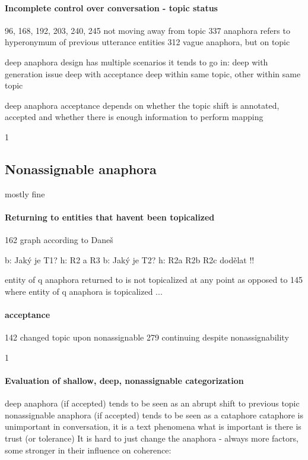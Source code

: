 \paragraph{Incomplete control over conversation - topic status}
    96, 168, 192, 203, 240, 245 not moving away from topic
    337 anaphora refers to hyperonymum of previous utterance entities
    312 vague anaphora, but on topic

    deep anaphora design has multiple scenarios it tends to go in:
    deep with generation issue
    deep with acceptance
    deep within same topic, other within same topic

    deep anaphora acceptance depends on
    whether the topic shift is annotated, accepted and
    whether there is enough information to perform mapping

1
\subsection{Nonassignable anaphora}
mostly fine

\paragraph{Returning to entities that havent been topicalized}
    162 graph according to Daneš

    b: Jaký je T1?
    h: R2 a R3
    b: Jaký je T2?
    h: R2a R2b R2c
    dodělat !!

    entity of q anaphora returned to is not topicalized at any point
    as opposed to 145 where entity of q anaphora is topicalized
    ...

\paragraph{acceptance}
    142 changed topic upon nonassignable
    279 continuing despite nonassignability

1
\paragraph{Evaluation of shallow, deep, nonassignable categorization}
deep anaphora (if accepted) tends to be seen as an abrupt shift to previous topic
nonassignable anaphora (if accepted) tends to be seen as a cataphore
    cataphore is unimportant in conversation, it is a text phenomena
    what is important is there is trust (or tolerance)
		It is hard to just change the anaphora - always more factors, some stronger in their influence on coherence:

